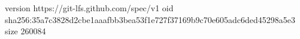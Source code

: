version https://git-lfs.github.com/spec/v1
oid sha256:35a7c3828d2cbe1aaafbb3bea53f1e727f37169b9c70e605adc6ded45298a5e3
size 260084
